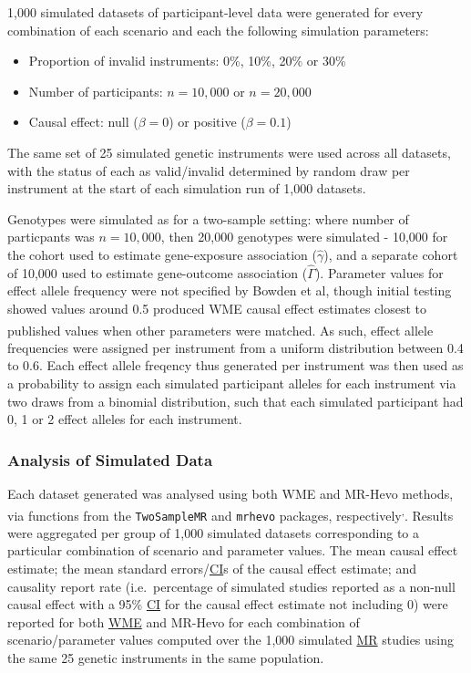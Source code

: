 \documentclass[
]{article}
\providecommand{\tightlist}{%
  \setlength{\itemsep}{0pt}\setlength{\parskip}{0pt}}
\begin{document}
1,000 simulated datasets of participant-level data were generated for every combination of each scenario and each the following simulation parameters:

\begin{itemize}
\tightlist
\item
  Proportion of invalid instruments: 0\%, 10\%, 20\% or 30\%
\item
  Number of participants: \(n = 10,000\) or \(n = 20,000\)
\item
  Causal effect: null (\(\beta = 0\)) or positive (\(\beta = 0.1\))
\end{itemize}

The same set of 25 simulated genetic instruments were used across all datasets, with the status of each as valid/invalid determined by random draw per instrument at the start of each simulation run of 1,000 datasets.

Genotypes were simulated as for a two-sample setting: where number of particpants was \(n = 10,000\), then 20,000 genotypes were simulated - 10,000 for the cohort used to estimate gene-exposure association (\(\hat{\gamma}\)), and a separate cohort of 10,000 used to estimate gene-outcome association (\(\hat{\Gamma}\)). Parameter values for effect allele frequency were not specified by Bowden et al, though initial testing showed values around 0.5 produced WME causal effect estimates closest to published values when other parameters were matched\textsuperscript{}. As such, effect allele frequencies were assigned per instrument from a uniform distribution between 0.4 to 0.6. Each effect allele freqency thus generated per instrument was then used as a probability to assign each simulated participant alleles for each instrument via two draws from a binomial distribution, such that each simulated participant had 0, 1 or 2 effect alleles for each instrument.

\subsubsection{Analysis of Simulated Data}\label{analysis-of-simulated-data}

Each dataset generated was analysed using both WME and MR-Hevo methods, via functions from the \texttt{TwoSampleMR} and \texttt{mrhevo} packages, respectively\textsuperscript{,}. Results were aggregated per group of 1,000 simulated datasets corresponding to a particular combination of scenario and parameter values. The mean causal effect estimate; the mean standard errors/\hyperref[acronyms_CI]{CI}s of the causal effect estimate; and causality report rate (i.e.~percentage of simulated studies reported as a non-null causal effect with a 95\% \hyperref[acronyms_CI]{CI} for the causal effect estimate not including 0) were reported for both \hyperref[acronyms_WME]{WME} and MR-Hevo for each combination of scenario/parameter values computed over the 1,000 simulated \hyperref[acronyms_MR]{MR} studies using the same 25 genetic instruments in the same population.
\end{document}

